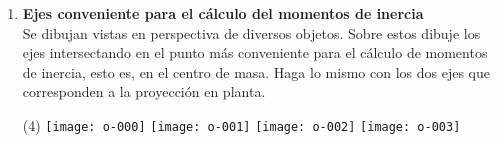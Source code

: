 \documentclass[11pt, spanish, a4paper, twoside]{article}
\begin{document}
\begin{enumerate}
	\item
	\textbf{Ejes conveniente para el cálculo del momentos de inercia}\\
	Se dibujan vistas en perspectiva de diversos objetos.
	Sobre estos dibuje los ejes intersectando en el punto más conveniente para el cálculo de momentos de inercia, esto es, en el centro de masa.
	Haga lo mismo con los dos ejes que corresponden a la proyección en planta.
	\vspace{-0.8cm}
	\begin{tasks}(4)
		\task \texttt{[image: o-000]}
		\task \texttt{[image: o-001]}
		\task \texttt{[image: o-002]}
		\task \texttt{[image: o-003]}
	\end{tasks}


	\end{enumerate}
\end{document}
